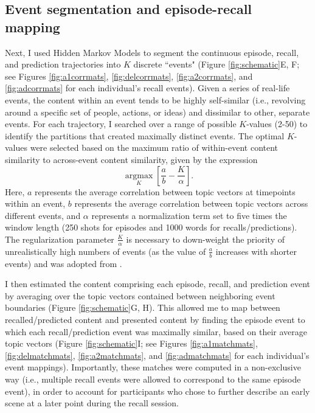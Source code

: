 \documentclass{article}
\newcommand{\argmax}{\mathop{\mathrm{argmax}}\limits}
\begin{document}
\subsection*{Event segmentation and episode-recall mapping}\label{sec:eventseg}
Next, I used Hidden Markov Models \citep[``HMMs";][]{Rabi89,BaldEtal17} to segment the continuous episode, recall, and prediction trajectories into $K$ discrete ``events" (Figure \ref{fig:schematic}E, F; see Figures \ref{fig:a1corrmats}, \ref{fig:delcorrmats}, \ref{fig:a2corrmats}, and \ref{fig:adcorrmats} for each individual's recall events).  Given a series of real-life events, the content within an event tends to be highly self-similar (i.e., revolving around a specific set of people, actions, or ideas) and dissimilar to other, separate events.  For each trajectory, I searched over a range of possible $K$-values (2-50) to identify the partitions that created maximally distinct events.  The optimal $K$-values were selected based on the maximum ratio of within-event content similarity to across-event content similarity, given by the expression
\[
  \argmax_K \left[\frac{a}{b} - \frac{K}{\alpha}\right].
\]
Here, $a$ represents the average correlation between topic vectors at timepoints within an event, $b$ represents the average correlation between topic vectors across different events, and $\alpha$ represents a normalization term set to five times the window length (250 shots for episodes and 1000 words for recalls/predictions).  The regularization parameter $\frac{K}{\alpha}$ is necessary to down-weight the priority of unrealistically high numbers of events (as the value of $\frac{a}{b}$ increases with shorter events) and was adopted from \cite{HeusEtal18c}.

I then estimated the content comprising each episode, recall, and prediction event by averaging over the topic vectors contained between neighboring event boundaries (Figure \ref{fig:schematic}G, H).  This allowed me to map between recalled/predicted content and presented content by finding the episode event to which each recall/prediction event was maximally similar, based on their average topic vectors (Figure \ref{fig:schematic}I; see Figures \ref{fig:a1matchmats}, \ref{fig:delmatchmats}, \ref{fig:a2matchmats}, and \ref{fig:admatchmats} for each individual's event mappings).  Importantly, these matches were computed in a non-exclusive way (i.e., multiple recall events were allowed to correspond to the same episode event), in order to account for participants who chose to further describe an early scene at a later point during the recall session.  
\FloatBarrier
\end{document}
